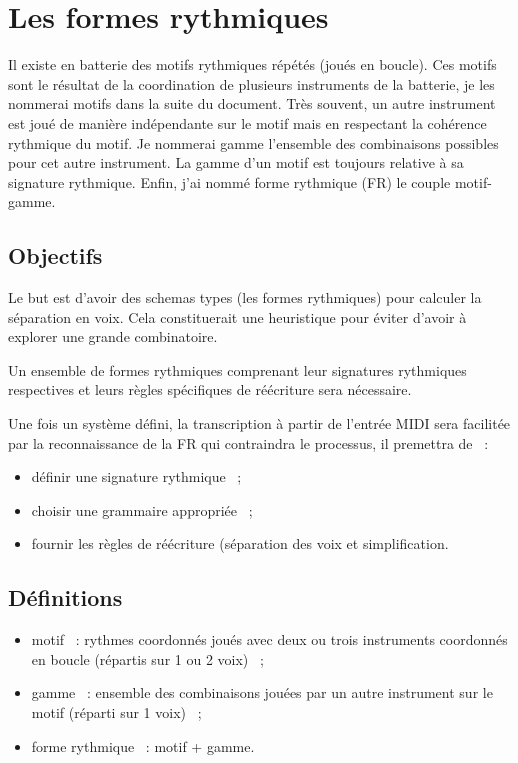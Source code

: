 \section{Les formes rythmiques}
\label{systemes_methodes}
Il existe en batterie des motifs rythmiques répétés (joués en boucle). Ces
motifs sont le résultat de la coordination de plusieurs instruments de la
batterie, je les nommerai motifs dans la suite du document. Très
souvent, un autre instrument est joué de manière indépendante sur le
motif mais en respectant la cohérence rythmique du motif. Je
nommerai gamme l’ensemble des combinaisons possibles pour cet autre
instrument. La gamme d’un motif est toujours relative à sa
signature rythmique. Enfin, j’ai nommé forme rythmique (FR)
le couple motif-gamme.

\subsection*{Objectifs}
Le but est d’avoir des schemas types (les formes rythmiques) pour
calculer la séparation en voix. Cela constituerait une heuristique pour éviter
d’avoir à explorer une grande combinatoire.

Un ensemble de formes rythmiques comprenant leur signatures rythmiques
respectives et leurs règles spécifiques de réécriture sera nécessaire.

Une fois un système défini, la transcription à partir de l’entrée MIDI sera
facilitée par la reconnaissance de la FR qui contraindra le processus, il
premettra de~ :
\begin{itemize}
	\item définir une signature rythmique~ ;
	\item choisir une grammaire appropriée~ ;
	\item fournir les règles de réécriture (séparation des voix et
        simplification.
\end{itemize}

\subsection*{Définitions}

\begin{itemize}
    \item motif~ : rythmes coordonnés joués avec deux ou trois
        instruments coordonnés en boucle (répartis sur 1 ou 2 voix)~ ;
    \item gamme~ : ensemble des combinaisons jouées par un autre
        instrument sur le motif (réparti sur 1 voix)~ ;
    \item forme rythmique~ : motif + gamme.\\
\end{itemize}

